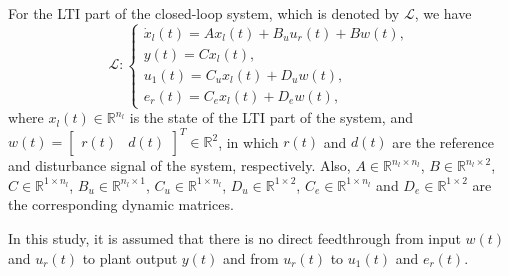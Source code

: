 For the LTI part of the closed-loop system, which is denoted by $\mathcal{L}$, we have
\begin{equation} 
		\mathcal{L} : \begin{cases}
			\label{eq.SS linear}
			\dot{x}_l(t)=Ax_l(t)+B_uu_r(t)+Bw(t),\\
			y(t)=Cx_l(t),\\
			u_1(t)=C_ux_l(t)+D_uw(t), \\
                e_r(t)=C_ex_l(t)+D_e w(t),
		\end{cases}
	\end{equation}
where $x_l(t)\in\mathbb{R}^{n_l}$ is the state of the LTI part of the system, and $w(t)=\begin{bmatrix}
    r(t) & d(t)
\end{bmatrix}^T\in\mathbb{R}^{2}$, in which $r(t)$ and $d(t)$ are the reference and disturbance signal of the system, respectively. Also, $A\in\mathbb{R}^{n_l \times n_l}$, $B\in\mathbb{R}^{n_l \times 2}$, $C\in\mathbb{R}^{1 \times n_l}$, $B_u\in\mathbb{R}^{n_l \times 1}$, $C_u\in\mathbb{R}^{1 \times n_l}$, $D_u\in\mathbb{R}^{1 \times 2}$, $C_e\in\mathbb{R}^{1 \times n_l}$ and $D_e\in\mathbb{R}^{1 \times 2}$ are the corresponding dynamic matrices.\\

\begin{assumption}
    \label{ass: assumption no direct feed through}
    In this study, it is assumed that there is no direct feedthrough from input $w(t)$ and $u_r(t)$ to plant output $y(t)$ and from $u_r(t)$ to $u_1(t)$ and $e_r(t)$.\\
\end{assumption}

